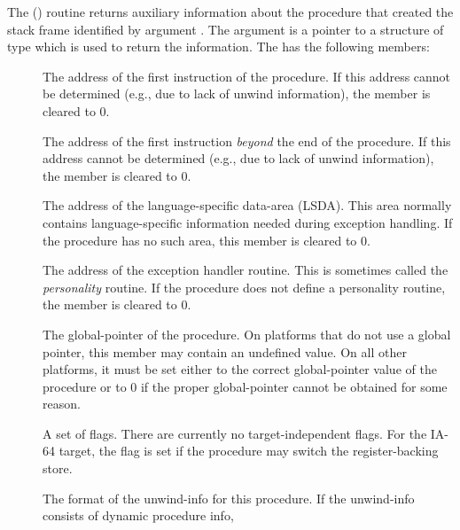 \documentclass{article}
\begin{document}
The () routine returns auxiliary
information about the procedure that created the stack frame
identified by argument .  The  argument is a pointer
to a structure of type  which is used to
return the information.  The  has the
following members:
\begin{description}
\item[ ] The address of the first
  instruction of the procedure.  If this address cannot be determined
  (e.g., due to lack of unwind information), the 
  member is cleared to 0.  \\
\item[ ] The address of the first
  instruction \emph{beyond} the end of the procedure.  If this address
  cannot be determined (e.g., due to lack of unwind information),
  the  member is cleared to 0.  \\
\item[ ] The address of the
  language-specific data-area (LSDA).  This area normally contains
  language-specific information needed during exception handling.  If
  the procedure has no such area, this member is cleared to 0.  \\
\item[ ] The address of the exception
  handler routine.  This is sometimes called the \emph{personality}
  routine.  If the procedure does not define
  a personality routine, the  member is cleared to 0.  \\
\item[ ] The global-pointer of the
  procedure.  On platforms that do not use a global pointer, this
  member may contain an undefined value.  On all other platforms, it
  must be set either to the correct global-pointer value of the
  procedure or to 0 if the proper global-pointer cannot be
  obtained for some reason.  \\
\item[ ] A set of flags.  There are
  currently no target-independent flags.  For the IA-64 target, the
  flag  is set if the
  procedure may switch the register-backing store.\\
\item[ ] The format of the unwind-info for this
  procedure.  If the unwind-info consists of dynamic procedure info,

\end{description}
\end{document}
